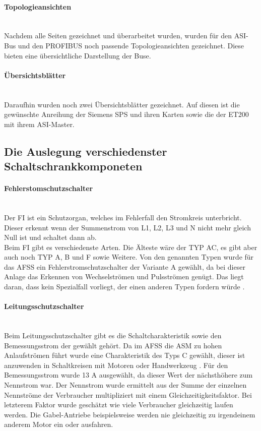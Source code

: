    \paragraph{Topologieansichten}\mbox{}\\
    Nachdem alle Seiten gezeichnet und überarbeitet wurden, wurden für den ASI-Bus und den PROFIBUS noch passende Topologieansichten gezeichnet. Diese bieten eine übersichtliche Darstellung der Buse.
    \paragraph{Übersichtsblätter}\mbox{}\\
    Daraufhin wurden noch zwei Übersichtsblätter gezeichnet. Auf diesen ist die gewünschte Anreihung der Siemens SPS und ihren Karten sowie die der ET200 mit ihrem ASI-Master.
\subsection{Die Auslegung verschiedenster Schaltschrankkomponeten}
    \paragraph{Fehlerstomschutzschalter}\mbox{}\\
    Der FI ist ein Schutzorgan, welches im Fehlerfall den Stromkreis unterbricht. Dieser erkennt wenn der Summenstrom von L1, L2, L3 und N nicht mehr gleich Null ist und schaltet dann ab.\\
    Beim FI gibt es verschiedenste Arten. Die Älteste wäre der TYP AC, es gibt aber auch noch TYP A, B und F sowie Weitere. Von den genannten Typen wurde für das AFSS ein Fehlerstromschutzschalter der Variante A gewählt, da bei dieser Anlage das Erkennen von Wechselströmen und Pulsströmen genügt. Das liegt daran, dass kein Spezialfall vorliegt, der einen anderen Typen fordern würde \cite{FI-Typen}.
    \paragraph{Leitungsschutzschalter}\mbox{}\\
    Beim Leitungsschutzschalter gibt es die Schaltcharakteristik sowie den Bemessungsstrom der gewählt gehört. Da im AFSS die ASM zu hohen Anlaufströmen führt wurde eine Charakteristik des Typs C gewählt, dieser ist anzuwenden in Schaltkreisen mit Motoren oder Handwerkzeug \cite{SeyrRösch}. Für den Bemessungsstrom wurde 13 A ausgewählt, da dieser Wert der nächsthöhere zum Nennstrom war. Der Nennstrom wurde ermittelt aus der Summe der einzelnen Nennströme der Verbraucher multipliziert mit einem Gleichzeitigkeitsfaktor. Bei letzterem Faktor wurde geschätzt wie viele Verbraucher gleichzeitig laufen werden. Die Gabel-Antriebe beispielsweise werden nie gleichzeitig zu irgendeinem anderem Motor ein oder ausfahren. 
